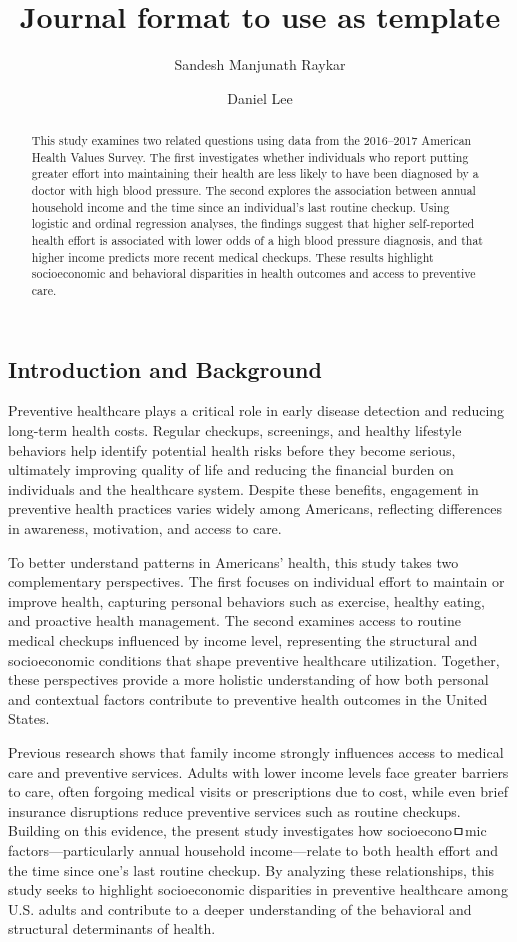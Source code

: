 \documentclass[
  letterpaper,
  DIV=11,
  numbers=noendperiod]{scrartcl}
\title{Journal format to use as template}
\author{Sandesh Manjunath Raykar \and Daniel Lee}
\date{}
\begin{document}
\maketitle
\begin{abstract}
This study examines two related questions using data from the 2016--2017
American Health Values Survey. The first investigates whether
individuals who report putting greater effort into maintaining their
health are less likely to have been diagnosed by a doctor with high
blood pressure. The second explores the association between annual
household income and the time since an individual's last routine
checkup. Using logistic and ordinal regression analyses, the findings
suggest that higher self-reported health effort is associated with lower
odds of a high blood pressure diagnosis, and that higher income predicts
more recent medical checkups. These results highlight socioeconomic and
behavioral disparities in health outcomes and access to preventive care.
\end{abstract}


\subsection{Introduction and Background}\label{sec-intro}

Preventive healthcare plays a critical role in early disease detection
and reducing long-term health costs. Regular checkups, screenings, and
healthy lifestyle behaviors help identify potential health risks before
they become serious, ultimately improving quality of life and reducing
the financial burden on individuals and the healthcare system. Despite
these benefits, engagement in preventive health practices varies widely
among Americans, reflecting differences in awareness, motivation, and
access to care.

To better understand patterns in Americans' health, this study takes two
complementary perspectives. The first focuses on individual effort to
maintain or improve health, capturing personal behaviors such as
exercise, healthy eating, and proactive health management. The second
examines access to routine medical checkups influenced by income level,
representing the structural and socioeconomic conditions that shape
preventive healthcare utilization. Together, these perspectives provide
a more holistic understanding of how both personal and contextual
factors contribute to preventive health outcomes in the United States.

Previous research shows that family income strongly influences access to
medical care and preventive services. Adults with lower income levels
face greater barriers to care, often forgoing medical visits or
prescriptions due to cost, while even brief insurance disruptions reduce
preventive services such as routine checkups. Building on this evidence,
the present study investigates how socioeconoㅁmic
factors---particularly annual household income---relate to both health
effort and the time since one's last routine checkup. By analyzing these
relationships, this study seeks to highlight socioeconomic disparities
in preventive healthcare among U.S. adults and contribute to a deeper
understanding of the behavioral and structural determinants of health.
\end{document}
